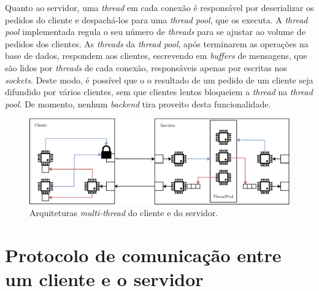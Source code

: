 \documentclass[11pt, a4paper]{article}
\begin{document}
Quanto ao servidor, uma \emph{thread} em cada conexão é responsável por deserializar os pedidos do
cliente e despachá-los para uma \emph{thread pool}, que os executa. A \emph{thread pool}
implementada regula o seu número de \emph{threads} para se ajustar ao volume de pedidos dos
clientes. As \emph{threads} da \emph{thread pool}, após terminarem as operações na base de dados,
respondem aos clientes, escrevendo em \emph{buffers} de mensagens, que são lidos por \emph{threads}
de cada conexão, responsáveis apenas por escritas nos \emph{sockets}. Deste modo, é possível que o o
resultado de um pedido de um cliente seja difundido por vários clientes, sem que clientes lentos
bloqueiem a \emph{thread} na \emph{thread pool}. De momento, nenhum \emph{backend} tira proveito
desta funcionalidade.

\begin{figure}[H]
    \centering
    \includegraphics[width=\textwidth]{res/ClientServer.eps}
    \caption{Arquiteturas \emph{multi-thread} do cliente e do servidor.}
    \label{client-server-architecture}
\end{figure}

\section{Protocolo de comunicação entre um cliente e o servidor}
\end{document}
